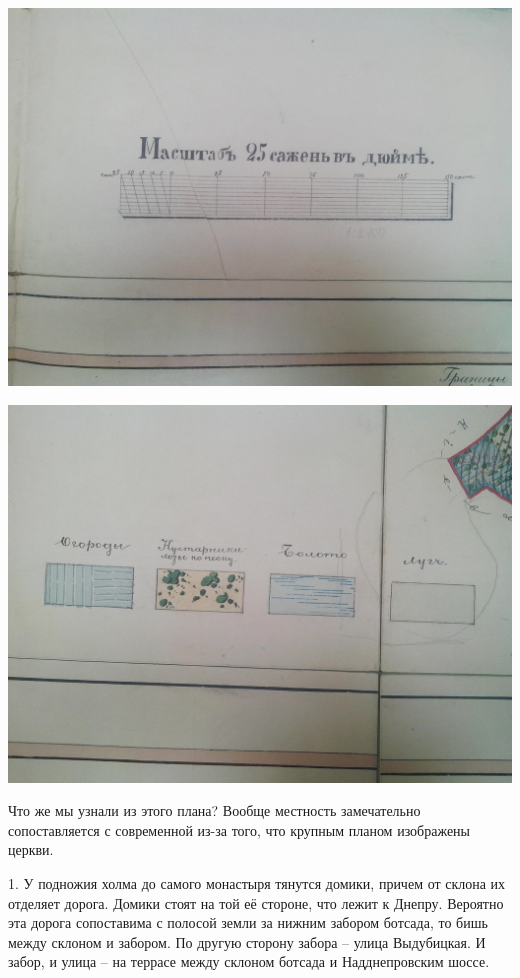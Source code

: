 \begin{center}
\includegraphics[width=\linewidth]{chast-vosp/zver/IMG_20170627_154035.jpg}
\end{center}


\begin{center}
\includegraphics[width=\linewidth]{chast-vosp/zver/IMG_20170627_154039.jpg}
\end{center}

Что же мы узнали из этого плана? Вообще местность замечательно сопоставляется с современной из-за того, что крупным планом изображены церкви.

1. У подножия холма до самого монастыря тянутся домики, причем от склона их отделяет дорога. Домики стоят на той её стороне, что лежит к Днепру. Вероятно эта дорога сопоставима с полосой земли за нижним забором ботсада, то бишь между склоном и забором. По другую сторону забора – улица Выдубицкая. И забор, и улица – на террасе между склоном ботсада и Надднепровским шоссе.

